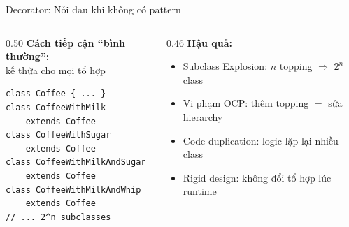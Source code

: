 \begin{frame}[fragile]{Decorator: Nỗi đau khi không có pattern}
  \begin{columns}[T]
    \begin{column}{0.50\textwidth}
      \textbf{Cách tiếp cận ``bình thường'':}\\[0.2em]
      {\small kế thừa cho mọi tổ hợp}
      
      \vspace{0.3em}
      \footnotesize
      \begin{verbatim}
class Coffee { ... }
class CoffeeWithMilk
    extends Coffee
class CoffeeWithSugar
    extends Coffee
class CoffeeWithMilkAndSugar
    extends Coffee
class CoffeeWithMilkAndWhip
    extends Coffee
// ... 2^n subclasses
      \end{verbatim}
    \end{column}
    \begin{column}{0.46\textwidth}
      \textbf{Hậu quả:}
      \begin{itemize}
        \item \textcolor{myred}{Subclass Explosion}: $n$ topping $\Rightarrow$ $2^n$ class
        \item \textcolor{myred}{Vi phạm OCP}: thêm topping $=$ sửa hierarchy
        \item \textcolor{myred}{Code duplication}: logic lặp lại nhiều class
        \item \textcolor{myred}{Rigid design}: không đổi tổ hợp lúc runtime
      \end{itemize}
    \end{column}
  \end{columns}
\end{frame}

